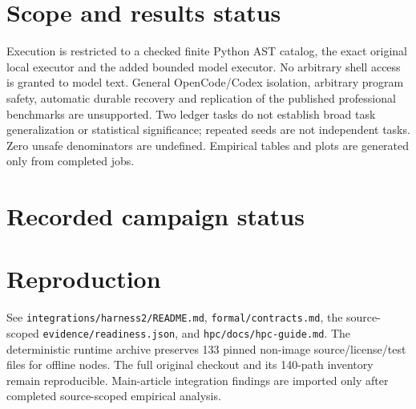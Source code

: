 \documentclass[11pt]{article}
\begin{document}
\section{Scope and results status}
Execution is restricted to a checked finite Python AST catalog, the exact original local executor and the added bounded model executor. No arbitrary shell access is granted to model text. General OpenCode/Codex isolation, arbitrary program safety, automatic durable recovery and replication of the published professional benchmarks are unsupported. Two ledger tasks do not establish broad task generalization or statistical significance; repeated seeds are not independent tasks. Zero unsafe denominators are undefined. Empirical tables and plots are generated only from completed jobs.

\section{Recorded campaign status}

\section{Reproduction}
See \texttt{integrations/harness2/README.md}, \texttt{formal/contracts.md}, the source-scoped \texttt{evidence/readiness.json}, and \texttt{hpc/docs/hpc-guide.md}. The deterministic runtime archive preserves 133 pinned non-image source/license/test files for offline nodes. The full original checkout and its 140-path inventory remain reproducible. Main-article integration findings are imported only after completed source-scoped empirical analysis.
\end{document}
